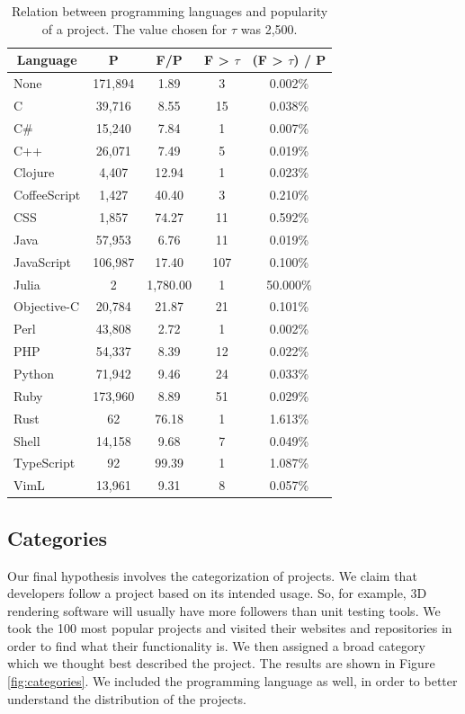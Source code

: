 \begin{table}
\centering
\begin{tabular}{ | l | c | c | c | c | }
	\hline
	\multicolumn{1}{|c|}{Language} & P & F/P & F > {$ \tau $} & (F > {$ \tau $}) / P \\ \hline
	None & 171,894 & 1.89 & 3 & 0.002\% \\ \hline
	C & 39,716 & 8.55 & 15 & 0.038\% \\ \hline
	C\# & 15,240 & 7.84 & 1 & 0.007\% \\ \hline
	C++ & 26,071 & 7.49 & 5 & 0.019\% \\ \hline
	Clojure & 4,407 & 12.94 & 1 & 0.023\% \\ \hline
	CoffeeScript & 1,427 & 40.40 & 3 & 0.210\% \\ \hline
	CSS & 1,857 & 74.27 & 11 & 0.592\% \\ \hline
	Java & 57,953 & 6.76 & 11 & 0.019\% \\ \hline
	JavaScript & 106,987 & 17.40 & 107 & 0.100\% \\ \hline
	Julia & 2 & 1,780.00 & 1 & 50.000\% \\ \hline
	Objective-C & 20,784 & 21.87 & 21 & 0.101\% \\ \hline
	Perl & 43,808 & 2.72 & 1 & 0.002\% \\ \hline
	PHP & 54,337 & 8.39 & 12 & 0.022\% \\ \hline
	Python & 71,942 & 9.46 & 24 & 0.033\% \\ \hline
	Ruby & 173,960 & 8.89 & 51 & 0.029\% \\ \hline
	Rust & 62 & 76.18 & 1 & 1.613\% \\ \hline
	Shell & 14,158 & 9.68 & 7 & 0.049\% \\ \hline
	TypeScript & 92 & 99.39 & 1 & 1.087\% \\ \hline
	VimL & 13,961 & 9.31 & 8 & 0.057\% \\ \hline
\end{tabular}
\caption{Relation between programming languages and popularity of a project. The value chosen for {$ \tau $} was 2,500.}
\label{tbl:languages}
\end{table}
\subsection{Categories}
Our final hypothesis involves the categorization of projects. We claim that developers follow a project based on its intended usage. So, for example, 3D rendering software will usually have more followers than unit testing tools. We took the 100 most popular projects and visited their websites and repositories in order to find what their functionality is. We then assigned a broad category which we thought best described the project. The results are shown in Figure \ref{fig:categories}. We included the programming language as well, in order to better understand the distribution of the projects.

